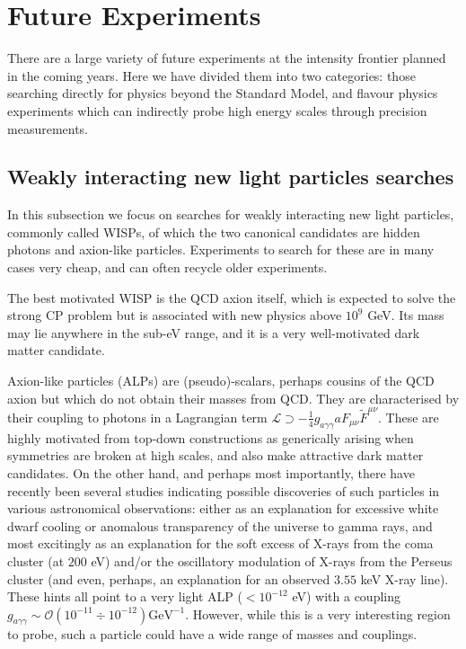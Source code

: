 
\section{Future Experiments}

There are a large variety of future experiments at the intensity frontier planned in the coming years. Here we have divided them into two categories: those searching directly for physics beyond the Standard Model, and flavour physics experiments which can indirectly probe high energy scales through precision measurements. 

\subsection{Weakly interacting new light particles searches}

In this subsection we focus on searches for weakly interacting new light particles, commonly called WISPs, of which the two canonical candidates are hidden photons and axion-like particles. Experiments to search for these are in many cases very cheap, and can often recycle older experiments. 


The best motivated WISP is the QCD axion itself, which is expected to solve the strong CP problem but is associated with new physics above $10^9$ GeV. Its mass may lie anywhere in the sub-eV range, and it is a very well-motivated dark matter candidate. 


Axion-like particles (ALPs) are (pseudo)-scalars, perhaps cousins of the QCD axion but which do not obtain their masses from QCD. They are characterised by their coupling to photons in a Lagrangian term $\mathcal{L} \supset - \frac{1}{4} g_{a\gamma \gamma} a F_{\mu \nu} \tilde{F}^{\mu \nu}.$ These are highly motivated from top-down constructions as generically arising when symmetries are broken at high scales, and also make attractive dark matter candidates. On the other hand, and perhaps most importantly, there have recently been several studies indicating possible discoveries of such particles in various astronomical observations: either as an explanation for excessive white dwarf cooling or anomalous transparency of the universe to gamma rays, and most excitingly as an explanation for the soft excess of X-rays from the coma cluster (at $200$ eV) and/or the oscillatory modulation of X-rays from the Perseus cluster (and even, perhaps, an explanation for an observed $3.55$ keV X-ray line). These hints all point to a very light ALP ($< 10^{-12}$ eV) with a coupling $g_{a\gamma \gamma} \sim \mathcal{O}(10^{-11} \div 10^{-12}) \mathrm{GeV}^{-1}.$ However, while this is a very interesting region to probe, such a particle could have a wide range of masses and couplings. 



